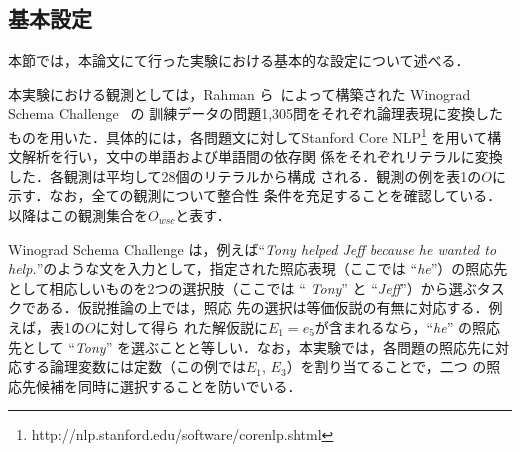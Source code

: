 \documentclass[japanese]{jnlp_1.4}
\begin{document}
\subsection{基本設定}

本節では，本論文にて行った実験における基本的な設定について述べる．

本実験における観測としては，Rahman ら~\cite{Rahman12}によって構築された
Winograd Schema Challenge~\cite{Levesque11} の
訓練データの問題1,305問をそれぞれ論理表現に変換した
ものを用いた．具体的には，各問題文に対してStanford Core
NLP\footnote{http://nlp.stanford.edu/software/corenlp.shtml}
\cite{CoreNLP} を用いて構文解析を行い，文中の単語および単語間の依存関
係をそれぞれリテラルに変換した．各観測は平均して28個のリテラルから構成
される．観測の例を表1の$O$に示す．なお，全ての観測について整合性
条件を充足することを確認している．以降はこの観測集合を$O_\mathit{wsc}$と表す．

Winograd Schema Challenge は，例えば``{\it Tony helped Jeff because he
wanted to help.}''のような文を入力として，指定された照応表現（ここでは
``{\it he}''）の照応先として相応しいものを2つの選択肢（ここでは ``{\it
Tony}'' と ``{\it Jeff}''）から選ぶタスクである．仮説推論の上では，照応
先の選択は等価仮説の有無に対応する．例えば，表1の$O$に対して得ら
れた解仮説に$E_1=e_5$が含まれるなら，``{\it he}'' の照応先として
``{\it Tony}'' を選ぶことと等しい．なお，本実験では，各問題の照応先に対
応する論理変数には定数（この例では$E_1$, $E_3$）を割り当てることで，二つ
の照応先候補を同時に選択することを防いでいる．

\begin{table}[t]
\label{tab:example}

\end{table}
\end{document}
